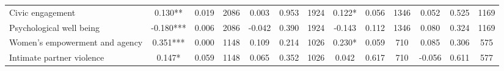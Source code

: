 \begin{tabular}{l*{12}{c}}
 Civic engagement &        0.130** &        0.019 & 2086    &        0.003 &        0.953 & 1924    &        0.122* &        0.056 & 1346 &        0.052 &        0.525 & 1169 \\ 

 Psychological well being &       -0.180*** &        0.006 & 2086    &       -0.042 &        0.390 & 1924    &       -0.143 &        0.112 & 1346 &        0.080 &        0.324 & 1169 \\ 

 Women's empowerment and agency &        0.351*** &        0.000 & 1148    &        0.109 &        0.214 & 1026    &        0.230* &        0.059 & 710 &        0.085 &        0.306 & 575 \\ 

 Intimate partner violence &        0.147* &        0.059 & 1148    &        0.065 &        0.352 & 1026    &        0.042 &        0.617 & 710 &       -0.056 &        0.611 & 577 \\ 

\hline \end{tabular}
